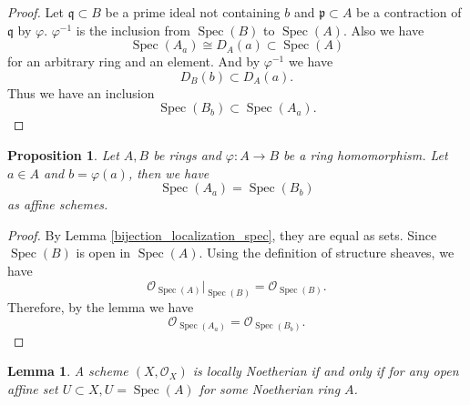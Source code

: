\documentclass{article}
\newtheorem{proposition}{Proposition}[section]
\newtheorem{lemma}{Lemma}[section]
\numberwithin{equation}{section}
\DeclareMathOperator{\Spec}{Spec}
\begin{document}
\begin{proof}
Let $\mathfrak{q}\subset B$ be a prime ideal not containing $b$ and $\mathfrak{p}\subset A$ be a contraction of $\mathfrak{q}$ by $\varphi$. $\varphi^{-1}$ is the inclusion from $\Spec(B)$ to $\Spec(A)$. Also we have
\begin{equation*}
\Spec(A_a)\cong D_A(a)\subset\Spec(A) %
\end{equation*}
for an arbitrary ring and an element. And by $\varphi^{-1}$ we have
\begin{equation*}
D_B(b)\subset D_A(a).
\end{equation*}
Thus we have an inclusion
\begin{equation*}
\Spec(B_b)\subset\Spec(A_a).
\end{equation*}
\end{proof}

\begin{proposition}
Let $A,B$ be rings and $\varphi:A\to B$ be a ring homomorphism. Let $a\in A$ and $b=\varphi(a)$, then we have
\begin{equation*}
\Spec(A_a)=\Spec(B_b)
\end{equation*}
as affine schemes.
\label{localization_scheme_isomorphism}
\end{proposition}

\begin{proof}
By Lemma \ref{bijection_localization_spec}, they are equal as sets. Since $\Spec(B)$ is open in $\Spec(A)$. %
Using the definition of structure sheaves, we have
\begin{equation*}
\mathcal{O}_{\Spec(A)}|_{\Spec(B)}=\mathcal{O}_{\Spec(B)}.
\end{equation*}
Therefore, by the lemma we have
\begin{equation*}
\mathcal{O}_{\Spec(A_a)}=\mathcal{O}_{\Spec(B_b)}.
\end{equation*}
\end{proof}

\begin{lemma}
A scheme $(X,\mathcal{O}_X)$ is locally Noetherian if and only if for any open affine set $U\subset X, U=\Spec(A)$ for some Noetherian ring $A$.
\end{lemma}
\end{document}
